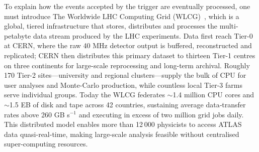 To explain how the events accepted by the trigger are eventually processed, one must introduce The Worldwide LHC Computing Grid (WLCG)~\cite{Bird:1695401}, which is a global, tiered infrastructure that stores, distributes and processes the multi-petabyte data stream produced by the LHC experiments.  Data first reach Tier-0 at CERN, where the raw 40 MHz detector output is buffered, reconstructed and replicated; CERN then distributes this primary dataset to thirteen Tier-1 centres on three continents for large-scale reprocessing and long-term archival. Roughly 170 Tier-2 sites—university and regional clusters—supply the bulk of CPU for user analyses and Monte-Carlo production, while countless local Tier-3 farms serve individual groups.  
Today the WLCG federates $\sim$1.4 million CPU cores and $\sim$1.5 EB of disk and tape across 42 countries, sustaining average data‐transfer rates above 260 GB s$^{-1}$ and executing in excess of two million grid jobs daily.  This distributed model enables more than 12 000 physicists to access ATLAS data quasi-real-time, making large-scale analysis feasible without centralised super-computing resources.
